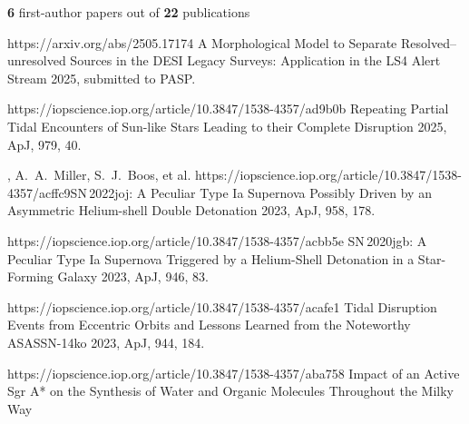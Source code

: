 


\begin{cvpubs}

\cvpub
{ %
{\bf 6} first-author papers out of {\bf 22} publications
}
\cvpub
{ %
\begin{cvitems}
    \item {}
    {}
    {https://arxiv.org/abs/2505.17174}
    {A Morphological Model to Separate Resolved--unresolved Sources in the DESI Legacy Surveys: Application in the LS4 Alert Stream}
    {2025, submitted to PASP.}
    \item {}
    {}
    {https://iopscience.iop.org/article/10.3847/1538-4357/ad9b0b}
    {Repeating Partial Tidal Encounters of Sun-like Stars Leading to their Complete Disruption}
    {2025, ApJ, 979, 40.}
    \item \cvsubpub
    {\Cliu, A.~A.~Miller, S.~J.~Boos, et al.}
    {}
    {https://iopscience.iop.org/article/10.3847/1538-4357/acffc9}{SN\,2022joj: A Peculiar Type Ia Supernova Possibly Driven by an Asymmetric Helium-shell Double Detonation}
    {2023, ApJ, 958, 178.}
    \item {}
    {}
    {https://iopscience.iop.org/article/10.3847/1538-4357/acbb5e}
    {SN\,2020jgb: A Peculiar Type Ia Supernova Triggered by a Helium-Shell Detonation in a Star-Forming Galaxy}
    {2023, ApJ, 946, 83.}
    \item {}
    {}
    {https://iopscience.iop.org/article/10.3847/1538-4357/acafe1}
    {Tidal Disruption Events from Eccentric Orbits and Lessons Learned from the Noteworthy ASASSN-14ko}
    {2023, ApJ, 944, 184.}
    \item {}
    {}
    {https://iopscience.iop.org/article/10.3847/1538-4357/aba758}
    {Impact of an Active Sgr A* on the Synthesis of Water and Organic Molecules Throughout the Milky Way}

\end{cvitems}}
\end{cvpubs}
